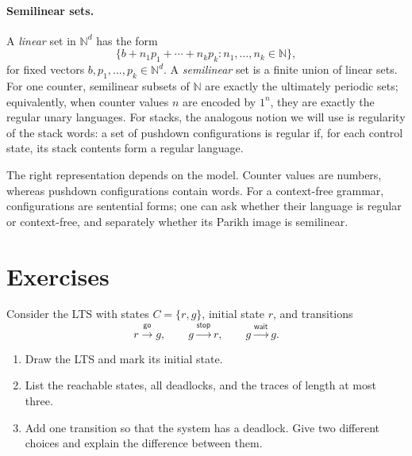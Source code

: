 \documentclass{tutorial}
\begin{document}
\paragraph{Semilinear sets.}
A \emph{linear} set in $\mathbb{N}^d$ has the form
\[
      \{b+n_1p_1+\cdots+n_kp_k:n_1,\ldots,n_k\in\mathbb{N}\},
\]
for fixed vectors $b,p_1,\ldots,p_k\in\mathbb{N}^d$. A \emph{semilinear} set is
a finite union of linear sets. For one counter, semilinear subsets of
$\mathbb{N}$ are exactly the ultimately periodic sets; equivalently, when
counter values $n$ are encoded by $1^n$, they are exactly the regular unary
languages. For stacks, the analogous notion we will use is regularity of
the stack words: a set of pushdown configurations is regular if, for each
control state, its stack contents form a regular language.

The right representation depends on the model. Counter values are numbers,
whereas pushdown configurations contain words. For a context-free grammar,
configurations are sentential forms; one can ask whether their language is
regular or context-free, and separately whether its Parikh image is
semilinear.

\section*{Exercises}

\begin{exercise}
Consider the LTS with states $C=\{r,g\}$, initial state $r$, and transitions
\[
  r\xrightarrow{\mathsf{go}}g,
  \qquad
  g\xrightarrow{\mathsf{stop}}r,
  \qquad
  g\xrightarrow{\mathsf{wait}}g.
\]
\begin{enumerate}
  \item Draw the LTS and mark its initial state.
  \item List the reachable states, all deadlocks, and the traces of length
        at most three.
  \item Add one transition so that the system has a deadlock. Give two
        different choices and explain the difference between them.
\end{enumerate}
\end{exercise}
\end{document}
